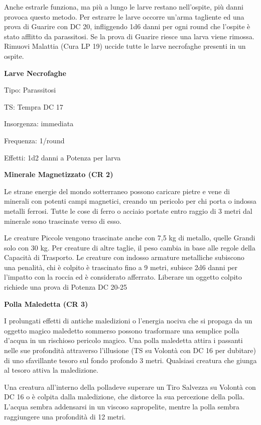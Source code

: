 \documentclass[a4paper,11pt,twoside,openany]{book}
\begin{document}
Anche estrarle funziona, ma più a lungo le larve restano nell'ospite, più danni provoca questo metodo. Per estrarre le larve occorre un'arma tagliente ed una prova di Guarire con DC 20, infliggendo 1d6 danni per ogni round che l'ospite è stato afflitto da parassitosi. Se la prova di Guarire riesce una larva viene rimossa. Rimuovi Malattia (Cura LP 19) uccide tutte le larve necrofaghe presenti in un ospite.

\textbf{Larve Necrofaghe}

Tipo: Parassitosi

TS: Tempra DC 17

Insorgenza: immediata

Frequenza: 1/round

Effetti: 1d2 danni a Potenza per larva

\textbf{Minerale Magnetizzato (CR 2)}

Le strane energie del mondo sotterraneo possono caricare pietre e vene di minerali con potenti campi magnetici, creando un pericolo per chi porta o indossa metalli ferrosi. Tutte le cose di ferro o acciaio portate entro raggio di 3 metri dal minerale sono trascinate verso di esso.

Le creature Piccole vengono trascinate anche con 7,5 kg di metallo, quelle Grandi solo con 30 kg. Per creature di altre taglie, il peso cambia in base alle regole della Capacità di Trasporto. Le creature con indosso armature metalliche subiscono una penalità, chi è colpito è trascinato fino a 9 metri, subisce 2d6 danni per l'impatto con la roccia ed è considerato afferrato. Liberare un oggetto colpito richiede una prova di Potenza DC 20-25

\textbf{Polla Maledetta (CR 3)}

I prolungati effetti di antiche maledizioni o l'energia nociva che si propaga da un oggetto magico maledetto sommerso possono trasformare una semplice polla d'acqua in un rischioso pericolo magico. Una polla maledetta attira i passanti nelle sue profondità attraverso l'illusione (TS su Volontà con DC 16 per dubitare) di uno sfavillante tesoro sul fondo profondo 3 metri. Qualsiasi creatura che giunga al tesoro attiva la maledizione.

Una creatura all'interno della polladeve superare un Tiro Salvezza su Volontà con DC 16 o è colpita dalla maledizione, che distorce la sua percezione della polla. L'acqua sembra addensarsi in un viscoso sapropelite, mentre la polla sembra raggiungere una profondità di 12 metri.
\end{document}
